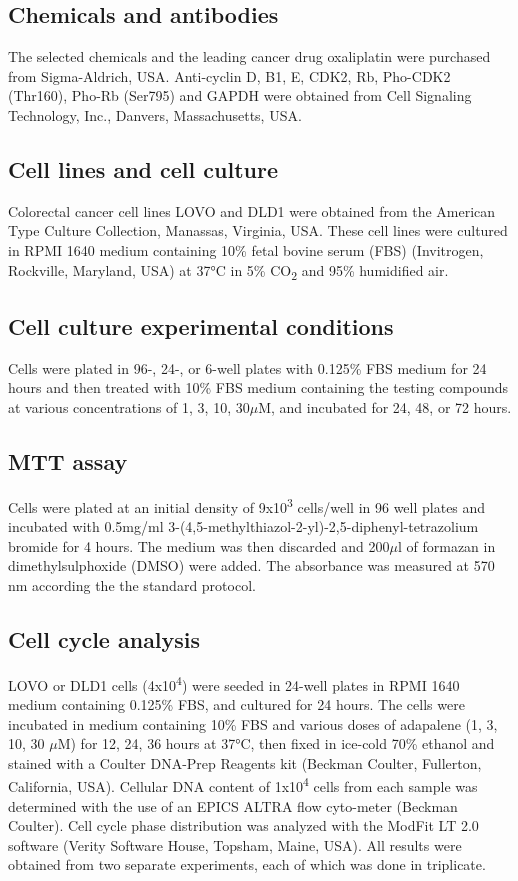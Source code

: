 \subsection{Chemicals and antibodies}

The selected chemicals and the leading cancer drug oxaliplatin were purchased from Sigma-Aldrich, USA. Anti-cyclin D, B1, E, CDK2, Rb, Pho-CDK2 (Thr160), Pho-Rb (Ser795) and GAPDH were obtained from Cell Signaling Technology, Inc., Danvers, Massachusetts, USA.

\subsection{Cell lines and cell culture}

Colorectal cancer cell lines LOVO and DLD1 were obtained from the American Type Culture Collection, Manassas, Virginia, USA. These cell lines were cultured in RPMI 1640 medium containing 10\% fetal bovine serum (FBS) (Invitrogen, Rockville, Maryland, USA) at 37°C in 5\% CO\textsubscript{2} and 95\% humidified air.

\subsection{Cell culture experimental conditions}

Cells were plated in 96-, 24-, or 6-well plates with 0.125\% FBS medium for 24 hours and then treated with 10\% FBS medium containing the testing compounds at various concentrations of 1, 3, 10, 30$\mu$M, and incubated for 24, 48, or 72 hours.

\subsection{MTT assay}

Cells were plated at an initial density of 9x10\textsuperscript{3} cells/well in 96 well plates and incubated with 0.5mg/ml 3-(4,5-methylthiazol-2-yl)-2,5-diphenyl-tetrazolium bromide for 4 hours. The medium was then discarded and 200$\mu$l of formazan in dimethylsulphoxide (DMSO) were added. The absorbance was measured at 570 nm according the the standard protocol.

\subsection{Cell cycle analysis}

LOVO or DLD1 cells (4x10\textsuperscript{4}) were seeded in 24-well plates in RPMI 1640 medium containing 0.125\% FBS, and cultured for 24 hours. The cells were incubated in medium containing 10\% FBS and various doses of adapalene (1, 3, 10, 30 $\mu$M) for 12, 24, 36 hours at 37°C, then fixed in ice-cold 70\% ethanol and stained with a Coulter DNA-Prep Reagents kit (Beckman Coulter, Fullerton, California, USA). Cellular DNA content of 1x10\textsuperscript{4} cells from each sample was determined with the use of an EPICS ALTRA flow cyto-meter (Beckman Coulter). Cell cycle phase distribution was analyzed with the ModFit LT 2.0 software (Verity Software House, Topsham, Maine, USA). All results were obtained from two separate experiments, each of which was done in triplicate.

